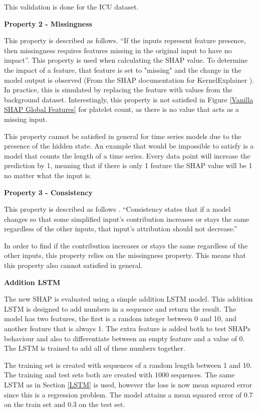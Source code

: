 \documentclass[12pt]{article}
\begin{document}
This validation is done for the ICU dataset. 

\textbf{Property 2 - Missingness}

This property is described as follows. ``If the inputs represent feature presence, then missingness requires features missing in the original input to have no impact''\cite{SHAP}. This property is used when calculating the SHAP value. To determine the impact of a feature, that feature is set to "missing" and the change in the model output is observed (From the SHAP documentation for KernelExplainer \cite{SHAP}). In practice, this is simulated by replacing the feature with values from the background dataset. Interestingly, this property is not satisfied in Figure \ref{Vanilla SHAP Global Features} for platelet count, as there is no value that acts as a missing input.

This property cannot be satisfied in general for time series models due to the presence of the hidden state. An example that would be impossible to satisfy is a model that counts the length of a time series. Every data point will increase the prediction by 1, meaning that if there is only 1 feature the SHAP value will be 1 no matter what the input is.

\textbf{Property 3 - Consistency}

This property is described as follows \cite{SHAP}. ``Consistency states that if a model changes so that some simplified input’s contribution increases or stays the same regardless of the other inputs, that input’s attribution should not decrease.'' 

In order to find if the contribution increases or stays the same regardless of the other inputs, this property relies on the missingness property. This means that this property also cannot satisfied in general.

\textbf{Addition LSTM}

The new SHAP is evaluated using a simple addition LSTM model. This addition LSTM is designed to add numbers in a sequence and return the result. The model has two features, the first is a random integer between 0 and 10, and another feature that is always 1. 
The extra feature is added both to test SHAPs behaviour and also to differentiate between an empty feature and a value of 0. The LSTM is trained to add all of these numbers together. 

The training set is created with sequences of a random length between 1 and 10. The training and test sets both are created with 1000 sequences. The same LSTM as in Section \ref{LSTM} is used, however the loss is now mean squared error since this is a regression problem. The model attains a mean squared error of 0.7 on the train set and 0.3 on the test set.
\end{document}
